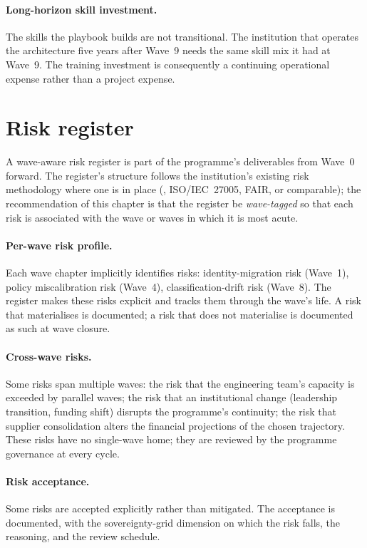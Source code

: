 \paragraph{Long-horizon skill investment.} The skills the
playbook builds are not transitional. The institution that
operates the architecture five years after Wave~9 needs the same
skill mix it had at Wave~9. The training investment is
consequently a continuing operational expense rather than a
project expense.

\section{Risk register}
\label{sec:cc-risk}

A wave-aware risk register is part of the programme's deliverables
from Wave~0 forward. The register's structure follows the
institution's existing risk methodology where one is in place
(, ISO/IEC~27005, FAIR, or comparable); the recommendation
of this chapter is that the register be \emph{wave-tagged} so that
each risk is associated with the wave or waves in which it is most
acute.

\paragraph{Per-wave risk profile.} Each wave chapter implicitly
identifies risks: identity-migration risk (Wave~1), policy
miscalibration risk (Wave~4), classification-drift risk (Wave~8).
The register makes these risks explicit and tracks them through
the wave's life. A risk that materialises is documented; a risk
that does not materialise is documented as such at wave closure.

\paragraph{Cross-wave risks.} Some risks span multiple waves: the
risk that the engineering team's capacity is exceeded by parallel
waves; the risk that an institutional change (leadership
transition, funding shift) disrupts the programme's continuity;
the risk that supplier consolidation alters the financial
projections of the chosen trajectory. These risks have no
single-wave home; they are reviewed by the programme governance
at every cycle.

\paragraph{Risk acceptance.} Some risks are accepted explicitly
rather than mitigated. The acceptance is documented, with the
sovereignty-grid dimension on which the risk falls, the
reasoning, and the review schedule.

